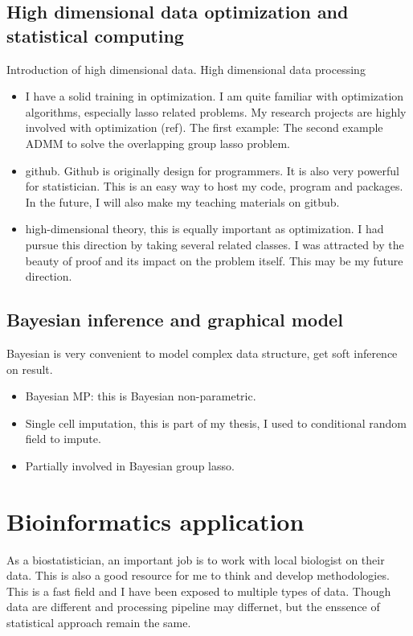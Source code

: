 \documentclass[a4paper, 10pt]{article}
\begin{document}
\subsection{High dimensional data optimization and statistical computing}
Introduction of high dimensional data.
High dimensional data processing
\begin{itemize}
\item I have a solid training in optimization.
I am quite familiar with optimization algorithms, especially lasso related problems.
My research projects are highly involved with optimization (ref).
The first example: 
The second example ADMM to solve the overlapping group lasso problem.
\item github. Github is originally design for programmers. 
It is also very powerful for statistician.
This is an easy way to host my code, program and packages.
In the future, I will also make my teaching materials on gitbub.
\item high-dimensional theory, this is equally important as optimization.
I had pursue this direction by taking several related classes.
I was attracted by the beauty of proof and its impact on the problem itself. 
This may be my future direction.
\end{itemize}

\subsection{Bayesian inference and graphical model}
Bayesian is very convenient to model complex data structure, 
get soft inference on result.
\begin{itemize}
\item Bayesian MP: this is Bayesian non-parametric.
\item Single cell imputation, this is part of my thesis, I used to conditional random field to impute.
\item Partially involved in Bayesian group lasso.
\end{itemize}

\section{Bioinformatics application}
As a biostatistician,
an important job is to work with local biologist on their data.
This is also a good resource for me to think and develop methodologies.
This is a fast field and I have been exposed to multiple types of data.
Though data are different and processing pipeline may differnet,
but the enssence of statistical approach remain the same.
\end{document}
